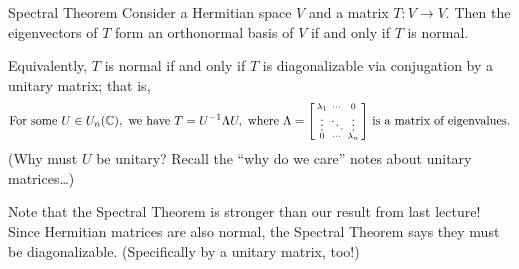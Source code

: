 \begin{theorem}{Spectral Theorem}
    Consider a Hermitian space $V$ and a matrix $T: V \to V$.  Then the eigenvectors of $T$ form an orthonormal basis of $V$ if and only if $T$ is normal.

    Equivalently, $T$ is normal if and only if $T$ is diagonalizable via conjugation by a unitary matrix; that is,
    \[ \text{For some } U \in U_n(\mathbb{C}), \text{ we have } T = U^{-1} \Lambda U, ~ \text{where } \Lambda = \begin{bsmallmatrix} \lambda_1 & \cdots & 0 \\ \vdots & \ddots & \vdots \\ 0 & \cdots & \lambda_n \end{bsmallmatrix} \text{ is a matrix of eigenvalues.} \]
    (Why must $U$ be unitary?  Recall the ``why do we care'' notes about unitary matrices\dots)
\end{theorem}

Note that the Spectral Theorem is stronger than our result from last lecture!  Since Hermitian matrices are also normal, the Spectral Theorem says they must be diagonalizable.  (Specifically by a unitary matrix, too!)

